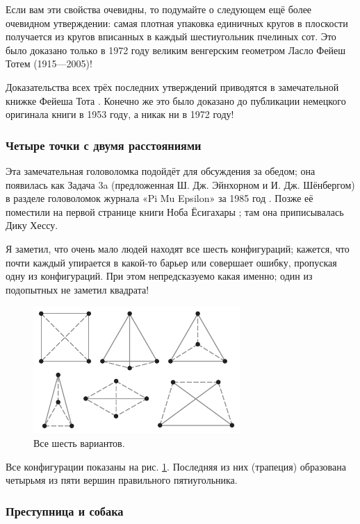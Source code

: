 Если вам эти свойства очевидны, то подумайте о следующем ещё более очевидном утверждении: самая плотная упаковка единичных кругов в плоскости получается из кругов вписанных в каждый шестиугольник пчелиных сот.
Это было доказано только в 1972 году великим венгерским геометром Ласло Фейеш Тотем (1915---2005)!

\begin{addedbytheeditors}
Доказательства всех трёх последних утверждений приводятся в замечательной книжке Фейеша Тота \cite[III §3]{tot}.
Конечно же это было доказано до публикации немецкого оригинала книги в 1953 году, а никак ни в 1972 году!
\end{addedbytheeditors}

\subsubsection*{Четыре точки с двумя расстояниями}

Эта замечательная головоломка подойдёт для обсуждения за обедом;
она появилась как Задача 3a (предложенная Ш. Дж. Эйнхорном и И. Дж. Шёнбергом) в разделе головоломок журнала «Pi Mu Epsilon» за 1985 год \cite{einhorn-schoenberg}.
Позже её поместили на первой странице книги Ноба Ёсигахары \cite{yoshigahara};
там она приписывалась Дику Хессу.

Я заметил, что очень мало людей находят все шесть конфигураций;
кажется, что почти каждый упирается в какой-то барьер или совершает ошибку, пропуская одну из конфигураций.
При этом непредсказуемо какая именно; один из подопытных не заметил квадрата!

\begin{figure}[h!]
\centering
\includegraphics[scale=1]{pics/2dist}
\caption{Все шесть вариантов.}
\label{pic:2dist}
\end{figure}

Все конфигурации показаны на рис. \ref{pic:2dist}.
Последняя из них (трапеция) образована четырьмя из пяти вершин правильного пятиугольника.


\subsubsection*{Преступница и собака}

